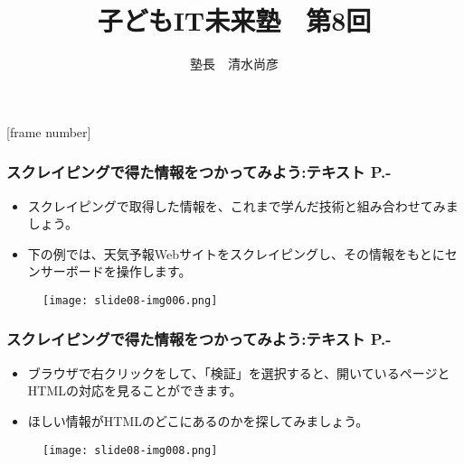 
\graphicspath{%
{./slide08-img/}%
{./text08-img/}%
}



[frame number]
\title{子どもIT未来塾　第8回}
\author{塾長　清水尚彦}

\def\quiz{1}



\begin{frame}[fragile]
	\frametitle{\large{スクレイピングで得た情報をつかってみよう:テキスト P.\pageref{1:P:scraping}-}~~~}
    \begin{itemize}
        \item スクレイピングで取得した情報を、これまで学んだ技術と組み合わせてみましょう。
        \item 下の例では、天気予報Webサイトをスクレイピングし、その情報をもとにセンサーボードを操作します。
    \end{itemize}
    \begin{figure}
      \centering
      \texttt{[image: slide08-img006.png]}
    \end{figure}
\end{frame}

\begin{frame}[fragile]
	\frametitle{\large{スクレイピングで得た情報をつかってみよう:テキスト P.\pageref{1:P:scraping}-}~~~}
    \begin{itemize}
        \item ブラウザで右クリックをして、「検証」を選択すると、開いているページとHTMLの対応を見ることができます。
        \item ほしい情報がHTMLのどこにあるのかを探してみましょう。
    \end{itemize}
    \begin{figure}
      \centering
      \texttt{[image: slide08-img008.png]}
    \end{figure}
\end{frame}

